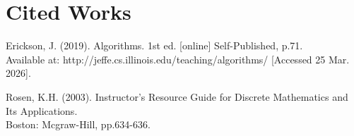 \documentclass{article}
\newcommand{\separate}[1] {\vspace{#1 pt}\noindent}
\begin{document}
\section{Cited Works}

Erickson, J. (2019). Algorithms. 1st ed. [online] Self-Published, p.71. \\ Available at: http://jeffe.cs.illinois.edu/teaching/algorithms/ [Accessed 25 Mar. 2026].\label{cit:1.algorithms}

\separate{7}Rosen, K.H. (2003). Instructor's Resource Guide for Discrete Mathematics and Its Applications. \\ Boston: Mcgraw-Hill, pp.634-636.\label{cit:2.eulerianCircuits}
\end{document}
